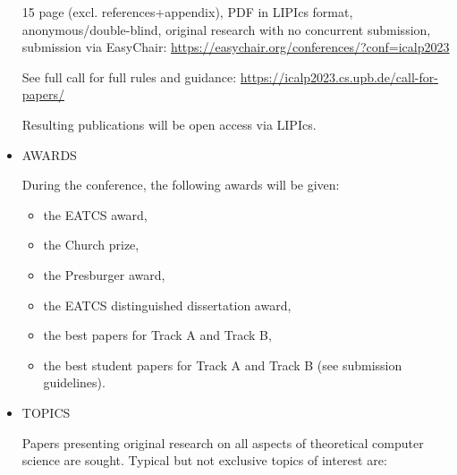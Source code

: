 \documentclass[prodmode,acmtecs]{acmsmall} %
\begin{document}
\begin{itemize}
  15 page (excl. references+appendix), PDF in LIPIcs format, anonymous/double-blind, original research with no concurrent submission, submission via EasyChair: \href{https://easychair.org/conferences/?conf=icalp2023}{https://easychair.org/conferences/?conf=icalp2023} 
 
  See full call for full rules and guidance: \href{https://icalp2023.cs.upb.de/call-for-papers/}{https://icalp2023.cs.upb.de/call-for-papers/} 
 
  Resulting publications will be open access via LIPIcs. 
 
\item  AWARDS 
 
  During the conference, the following awards will be given: 
 
\begin{itemize}\item  the EATCS award,
\item  the Church prize,
\item  the Presburger award,
\item  the EATCS distinguished dissertation award,
\item  the best papers for Track A and Track B,
\item  the best student papers for Track A and Track B (see submission guidelines).
\end{itemize} 
\item  TOPICS 
 
  Papers presenting original research on all aspects of theoretical computer science are sought. Typical but not exclusive topics of interest are: 
 

\end{itemize}
\end{document}
